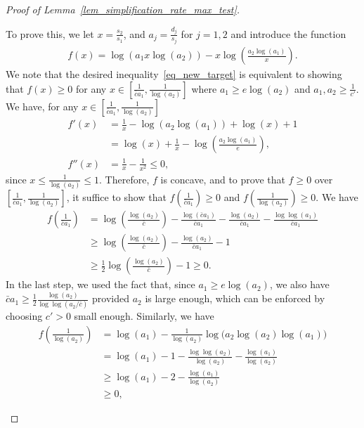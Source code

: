 \documentclass{article}
\theoremstyle{remark}
\begin{document}
\begin{proof}[Proof of Lemma~\ref{lem_simplification_rate_max_test}]
\begin{enumerate}
    To prove this, we let $x = \frac{s_2}{s_1}$, and $a_j = \frac{d_j}{s_j}$ for $j=1,2$ and introduce the function 
\begin{align*}
    f(x) = \log\left(a_1 x \log(a_2)\right) - x \log\left(\frac{a_2\log(a_1)}{x}\right).
\end{align*}
We note that the desired inequality~\eqref{eq_new_target} is equivalent to showing that $f(x) \geq 0$ for any $x \in \left[\frac{1}{\bar c a_1}, \frac{1}{\log(a_2)}\right]$ where $a_1 \geq e \log(a_2)$ and $a_1, a_2 \geq \frac{1}{c'}$.
We have, for any $x \in \left[\frac{1}{\bar c a_1}, \frac{1}{\log(a_2)}\right]$
\begin{align*}
    f'(x) &= \frac{1}{x} - \log(a_2 \log(a_1)) + \log(x) + 1 \\
    & = \log(x) + \frac{1}{x} - \log\left(\frac{a_2 \log(a_1)}{e}\right),\\
    f''(x) &= \frac{1}{x} - \frac{1}{x^2} \leq 0,
\end{align*}
since $x \leq \frac{1}{\log(a_2)} \leq 1$. 
Therefore, $f$ is concave, and to prove that $f \geq 0$ over $\left[\frac{1}{\bar c a_1}, \frac{1}{\log(a_2)}\right]$, it suffice to show that $f\left(\frac{1}{\bar c a_1}\right) \geq 0$ and $f \left(\frac{1}{\log(a_2)}\right)\geq 0$. 
We have
\begin{align*}
    f\left(\frac{1}{\bar c a_1}\right) &= \log\left(\frac{\log(a_2)}{\bar c}\right) - \frac{\log(\bar c a_1)}{\bar c a_1}  - \frac{\log(a_2)}{\bar c a_1} - \frac{\log\log(a_1)}{\bar c a_1}\\
    &\geq \log\left(\frac{\log(a_2)}{\bar c}\right)   - \frac{\log(a_2)}{\bar c a_1} - 1\\
    & \geq \frac{1}{2}\log\left(\frac{\log(a_2)}{\bar c}\right) - 1 \geq 0.
\end{align*}
In the last step, we used the fact that, since $a_1 \geq e \log(a_2)$, we also have $\bar c a_1 \geq \frac{1}{2} \frac{\log(a_2)}{\log \log(a_2/\bar c)}$
provided $a_2$ is large enough, which can be enforced by choosing $c'>0$ small enough. 
Similarly, we have
\begin{align*}
    f\left(\frac{1}{\log(a_2)}\right) &= \log(a_1) - \frac{1}{\log(a_2)} \log\Big(a_2\log(a_2)\log(a_1)\Big)\\
    & = \log(a_1) - 1 - \frac{\log \log(a_2)}{\log(a_2)} - \frac{\log(a_1)}{\log(a_2)}\\
    & \geq \log(a_1) - 2 - \frac{\log(a_1)}{\log(a_2)}\\
    &
    \geq 0,
\end{align*}

\end{enumerate}
\end{proof}
\end{document}
